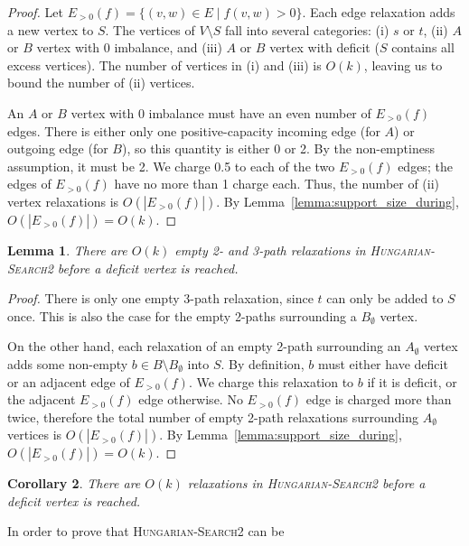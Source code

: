 \documentclass[11pt]{article}
\theoremstyle{plain}
\newtheorem{lemma}{Lemma}[section]
\newtheorem{corollary}[lemma]{Corollary}
\numberwithin{figure}{section}
\begin{document}
\begin{proof}
Let $E_{>0}(f) = \{(v, w) \in E \mid f(v, w) > 0\}$.
Each edge relaxation adds a new vertex to $S$.
The vertices of $V \setminus S$ fall into several categories:
(i) $s$ or $t$, (ii) $A$ or $B$ vertex with 0 imbalance, and (iii) $A$ or $B$
vertex with deficit ($S$ contains all excess vertices).
The number of vertices in (i) and (iii) is $O(k)$, leaving us to bound the
number of (ii) vertices.

An $A$ or $B$ vertex with 0 imbalance must have an even number of $E_{>0}(f)$
edges.
There is either only one positive-capacity incoming edge (for $A$) or outgoing
edge (for $B$), so this quantity is either 0 or 2.
By the non-emptiness assumption, it must be 2.
We charge 0.5 to each of the two $E_{>0}(f)$ edges; the edges of $E_{>0}(f)$
have no more than 1 charge each.
Thus, the number of (ii) vertex relaxations is $O(|E_{>0}(f)|)$.
By Lemma~\ref{lemma:support_size_during}, $O(|E_{>0}(f)|) = O(k)$.
\end{proof}

\begin{lemma}
\label{lemma:goldberg_hs_length2}
There are $O(k)$ empty 2- and 3-path relaxations in \textsc{Hungarian-Search2}
before a deficit vertex is reached.
\end{lemma}

\begin{proof}
There is only one empty 3-path relaxation, since $t$ can only be added to $S$
once.
This is also the case for the empty 2-paths surrounding a $B_\emptyset$ vertex.

On the other hand, each relaxation of an empty 2-path surrounding an
$A_\emptyset$ vertex adds some non-empty $b \in B \setminus B_\emptyset$ into
$S$.
By definition, $b$ must either have deficit or an adjacent edge of $E_{>0}(f)$.
We charge this relaxation to $b$ if it is deficit, or the adjacent $E_{>0}(f)$
edge otherwise.
No $E_{>0}(f)$ edge is charged more than twice, therefore the total number of
empty 2-path relaxations surrounding $A_\emptyset$ vertices is
$O(|E_{>0}(f)|)$.
By Lemma~\ref{lemma:support_size_during}, $O(|E_{>0}(f)|) = O(k)$.
\end{proof}

\begin{corollary}
\label{corollary:goldberg_hs_length}
There are $O(k)$ relaxations in \textsc{Hungarian-Search2} before a deficit
vertex is reached.
\end{corollary}

In order to prove that \textsc{Hungarian-Search2} can be
\end{document}
